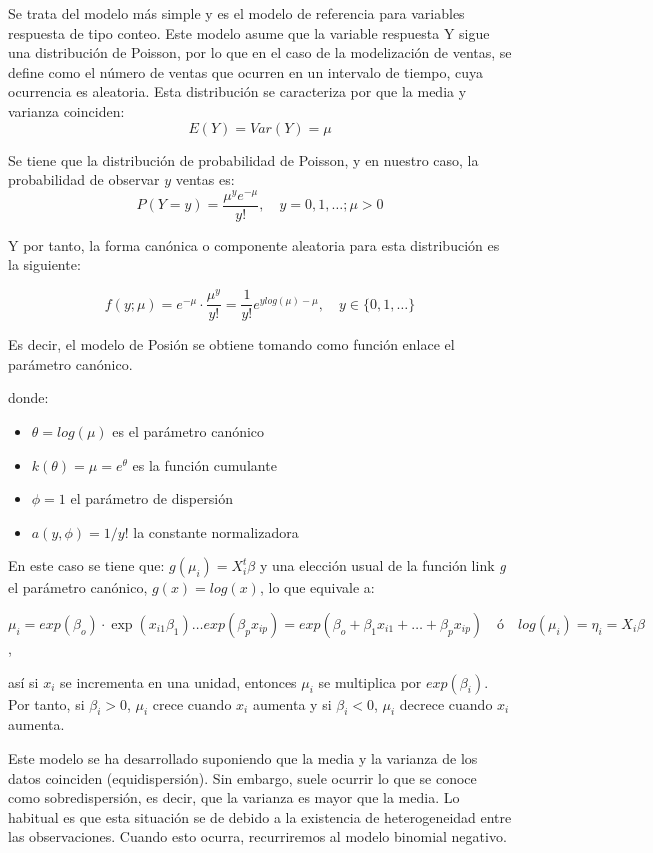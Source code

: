 \documentclass[12pt,a4paper,]{book}
\providecommand{\tightlist}{%
  \setlength{\itemsep}{0pt}\setlength{\parskip}{0pt}}
\numberwithin{dummy}{section}
\theoremstyle{ocrenumbox}
\theoremstyle{blacknumex}
\theoremstyle{blacknumbox}
\theoremstyle{ocrenum}
\theoremstyle{ocrenum}
\begin{document}
Se trata del modelo más simple y es el modelo de referencia para
variables respuesta de tipo conteo. Este modelo asume que la variable
respuesta Y sigue una distribución de Poisson, por lo que en el caso de
la modelización de ventas, se define como el número de ventas que
ocurren en un intervalo de tiempo, cuya ocurrencia es aleatoria. Esta
distribución se caracteriza por que la media y varianza coinciden: \[
E(Y)=Var(Y) =\mu 
\]

Se tiene que la distribución de probabilidad de Poisson, y en nuestro
caso, la probabilidad de observar \(y\) ventas es:
\[P(Y=y)= \dfrac{\mu^y e^{-\mu}}{y!}, \quad y=0,1,\dots;\mu>0\]

Y por tanto, la forma canónica o componente aleatoria para esta
distribución es la siguiente:

\[
f(y;\mu) = e^{-\mu}\cdot \frac{\mu^y}{y!} = \frac{1}{y!}e^{ylog(\mu)-\mu}, \quad y \in \{0,1,\dots\}
\]

Es decir, el modelo de Posión se obtiene tomando como función enlace el
parámetro canónico.

donde:

\begin{itemize}
\tightlist
\item
  \(\theta= log(\mu)\) es el parámetro canónico
\item
  \(k(\theta)= \mu=e^\theta\) es la función cumulante
\item
  \(\phi=1\) el parámetro de dispersión
\item
  \(a(y,\phi)= 1/y!\) la constante normalizadora
\end{itemize}

En este caso se tiene que: \(g(\mu_i)=X^t_i\beta\) y una elección usual
de la función link \emph{g} el parámetro canónico, \(g(x)=log(x)\), lo
que equivale a:

\[\mu_i=exp(\beta_o)\cdot\exp(x_{i1}\beta_1)\dots exp(\beta_px_{ip})= exp(\beta_o+\beta_1x_{i1}+\dots + \beta_px_{ip}) \quad \text{ó} \quad log(\mu_i) = \eta_i = X_i\beta\],

así si \(x_i\) se incrementa en una unidad, entonces \(\mu_i\) se
multiplica por \(exp(\beta_i)\). Por tanto, si \(\beta_i>0\), \(\mu_i\)
crece cuando \(x_i\) aumenta y si \(\beta_i<0\), \(\mu_i\) decrece
cuando \(x_i\) aumenta.

Este modelo se ha desarrollado suponiendo que la media y la varianza de
los datos coinciden (equidispersión). Sin embargo, suele ocurrir lo que
se conoce como sobredispersión, es decir, que la varianza es mayor que
la media. Lo habitual es que esta situación se de debido a la existencia
de heterogeneidad entre las observaciones. Cuando esto ocurra,
recurriremos al modelo binomial negativo.
\end{document}
